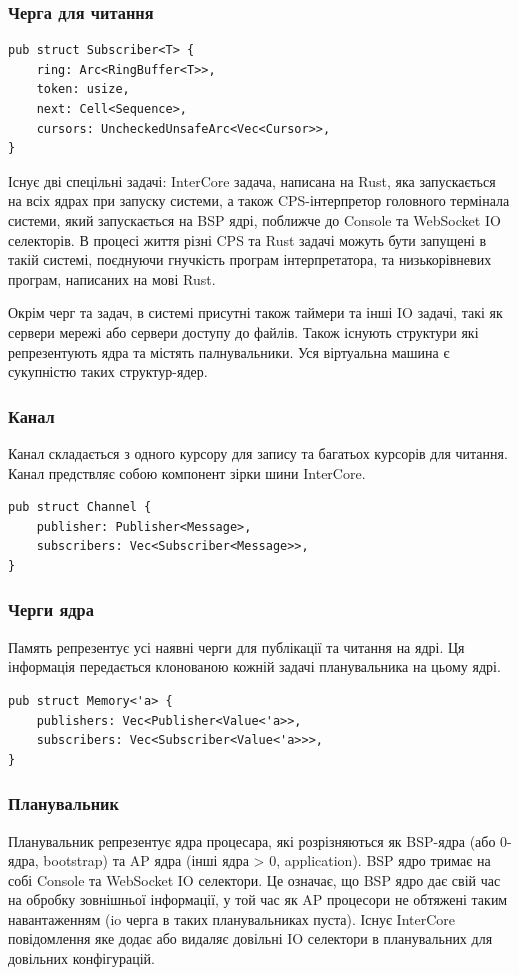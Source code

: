 \subsubsection{Черга для читання}
\begin{lstlisting}
pub struct Subscriber<T> {
    ring: Arc<RingBuffer<T>>,
    token: usize,
    next: Cell<Sequence>,
    cursors: UncheckedUnsafeArc<Vec<Cursor>>,
}
\end{lstlisting}

Існує дві спецільні задачі: InterCore задача, написана на Rust,
яка запускається на всіх ядрах при запуску системи, а також CPS-інтерпретор
головного термінала системи, який запускається на BSP ядрі, поближче до Console та WebSocket IO селекторів.
В процесі життя різні CPS та Rust задачі можуть бути запущені в такій системі,
поєднуючи гнучкість програм інтерпретатора, та низькорівневих програм, написаних на мові Rust.

Окрім черг та задач, в системі присутні також таймери та інші IO задачі,
такі як сервери мережі або сервери доступу до файлів. Також існують
структури які репрезентують ядра та містять палнувальники.
Уся віртуальна машина є сукупністю таких структур-ядер.

\newpage
\subsubsection{Канал}
Канал складається з одного курсору для запису та багатьох курсорів для читання.
Канал предствляє собою компонент зірки шини InterCore.
\begin{lstlisting}
pub struct Channel {
    publisher: Publisher<Message>,
    subscribers: Vec<Subscriber<Message>>,
}
\end{lstlisting}


\subsubsection{Черги ядра}
Память репрезентує усі наявні черги для публікації та читання на ядрі.
Ця інформація передається клонованою кожній задачі планувальника на цьому ядрі.
\begin{lstlisting}
pub struct Memory<'a> {
    publishers: Vec<Publisher<Value<'a>>,
    subscribers: Vec<Subscriber<Value<'a>>>,
}
\end{lstlisting}

\subsubsection{Планувальник}
Планувальник репрезентує ядра процесара,
які розрізняються як BSP-ядра (або 0-ядра, bootstrap)
та AP ядра (інші ядра > 0, application). BSP ядро
тримає на собі Console та WebSocket IO селектори.
Це означає, що BSP ядро дає свій час на обробку зовнішньої інформації,
у той час як AP процесори не обтяжені
таким навантаженням (io черга в таких планувальниках пуста).
Існує InterCore повідомлення яке додає або видаляє довільні IO селектори
в планувальних для довільних конфігурацій.

